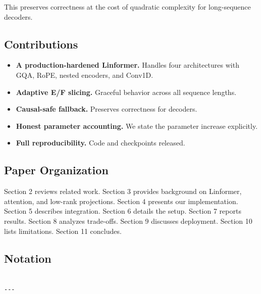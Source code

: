 This preserves correctness at the cost of quadratic complexity for 
long-sequence decoders.

\subsection{Contributions}

\begin{itemize}
\item \textbf{A production-hardened Linformer.} Handles four architectures with
  GQA, RoPE, nested encoders, and Conv1D.
\item \textbf{Adaptive E/F slicing.} Graceful behavior across all sequence lengths.
\item \textbf{Causal-safe fallback.} Preserves correctness for decoders.
\item \textbf{Honest parameter accounting.} We state the parameter increase
  explicitly.
\item \textbf{Full reproducibility.} Code and checkpoints released.

\end{itemize}
\subsection{Paper Organization}

Section 2 reviews related work. Section 3 provides background on Linformer, 
attention, and low-rank projections. Section 4 presents our implementation. 
Section 5 describes integration. Section 6 details the setup. Section 7 
reports results. Section 8 analyzes trade-offs. Section 9 discusses 
deployment. Section 10 lists limitations. Section 11 concludes.



\subsection{Notation}

\begin{lstlisting}

---
\end{lstlisting}